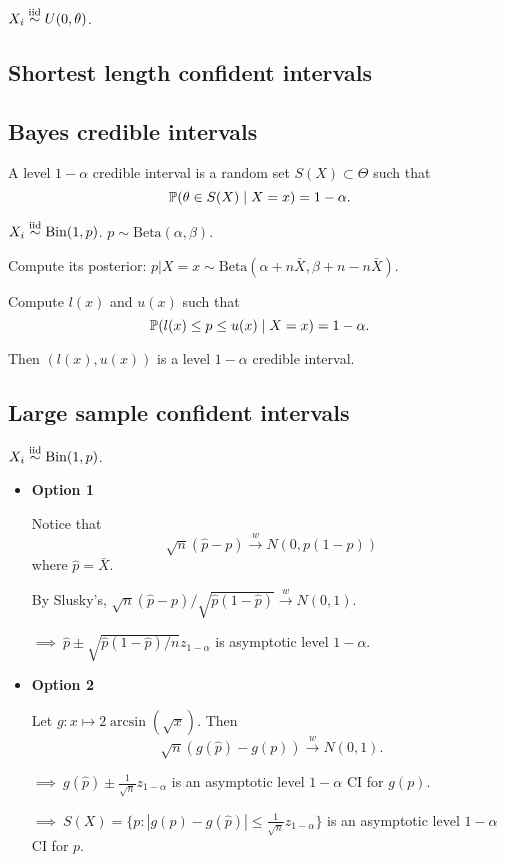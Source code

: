 \begin{exap}
	$X_i \stackrel{\text{iid}}{\sim} U(0,\theta)$.
\end{exap}

\subsection{Shortest length confident intervals}

\subsection{Bayes credible intervals}
\begin{mydef}
	A level $1-\alpha$ credible interval is a random set $S(X)\subset \Theta$ such that
	$$\mathbb{P}(\theta \in S(X) \mid X = x) = 1 - \alpha.$$
\end{mydef}

\begin{exap}
	$X_i\stackrel{\text{iid}}{\sim} \mathrm{Bin}(1,p)$. $p \sim \mathrm{Beta}(\alpha,\beta)$.
	
	Compute its posterior: $p|X=x \sim \mathrm{Beta}( \alpha+ n\bar{X}, \beta + n - n\bar{X} )$.
	
	Compute $l(x)$ and $u(x)$ such that 
	$$\mathbb{P}( l(x) \leq p \leq u(x)\mid X=x ) = 1 - \alpha.$$	
	
	Then $(l(x), u(x))$ is a level $1-\alpha$ credible interval.
\end{exap}

\subsection{Large sample confident intervals} 
\begin{exap}
	$X_i\stackrel{\text{iid}}{\sim} \mathrm{Bin}(1,p)$. 
	
	\begin{itemize}
		\item \textbf{Option 1}
		
		
		Notice that 
		$$\sqrt{n}(\hat{p} - p) \xrightarrow{w} N(0, p(1-p))$$
		where $\hat{p} = \bar{X}$.
	
		By Slusky's, $\sqrt{n}(\hat{p} - p)/\sqrt{ \hat{p}(1-\hat{p}) } \xrightarrow{w} N(0,1)$.
		
		$\implies \ \hat{p} \pm \sqrt{ \hat{p}(1-\hat{p})/n } z_{1-\alpha}$ is asymptotic level $1-\alpha$.
		
		\item \textbf{Option 2}
		
		Let $g:x \mapsto 2\arcsin(\sqrt{x})$. Then
		$$\sqrt{n}( g(\hat{p}) - g(p) ) \xrightarrow{w} N(0,1).$$
		
		$\implies \ g(\hat{p}) \pm  \frac{1}{\sqrt{n}} z_{1-\alpha}$ is an asymptotic level $1-\alpha$ CI for $g(p)$.
		
		$\implies \ S(X) = \{ p: | g(p) - g(\hat{p}) |\leq \frac{1}{\sqrt{n}} z_{1-\alpha} \}$ is an asymptotic level $1-\alpha$ CI for $p$.
	\end{itemize}
\end{exap}